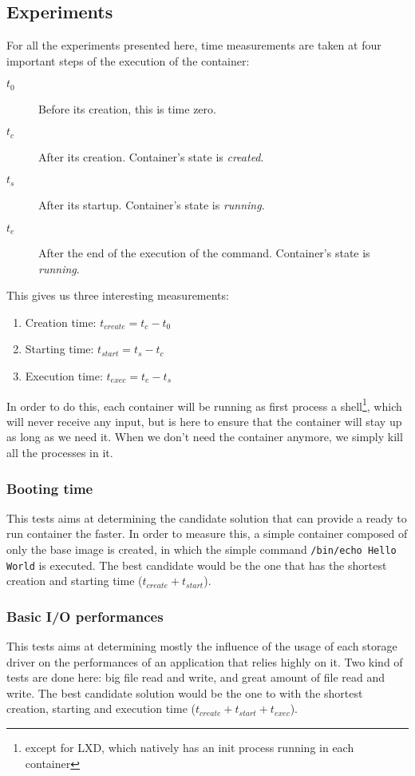 \subsection{Experiments} \label{subs:experiments}
For all the experiments presented here, time measurements are taken at four important steps of the execution of the container:
\begin{description}
  \item[$t_0$] Before its creation, this is time zero.
  \item[$t_c$] After its creation. Container's state is \textit{created}.
  \item[$t_s$] After its startup. Container's state is \textit{running}.
  \item[$t_e$] After the end of the execution of the command. Container's state is \textit{running}.
\end{description}
This gives us three interesting measurements:
\begin{enumerate}
  \item Creation time: $t_{create}=t_c - t_0$
  \item Starting time: $t_{start}=t_s - t_c$
  \item Execution time: $t_{exec}=t_e - t_s$
\end{enumerate}

In order to do this, each container will be running as first process a shell\footnote{except for LXD, which natively has an init process running in each container}, which will never receive any input, but is here to ensure that the container will stay up as long as we need it.  When we don't need the container anymore, we simply kill all the processes in it.

\subsubsection{Booting time}
This tests aims at determining the candidate solution that can provide a ready to run container the faster.  In order to measure this, a simple container composed of only the base image is created, in which the simple command \texttt{/bin/echo Hello World} is executed.  The best candidate would be the one that has the shortest creation and starting time ($t_{create} + t_{start}$).

\subsubsection{Basic I/O performances}
This tests aims at determining mostly the influence of the usage of each storage driver on the performances of an application that relies highly on it.  Two kind of tests are done here: big file read and write, and great amount of file read and write.  The best candidate solution would be the one to with the shortest creation, starting and execution time ($t_{create} + t_{start} + t_{exec}$).

